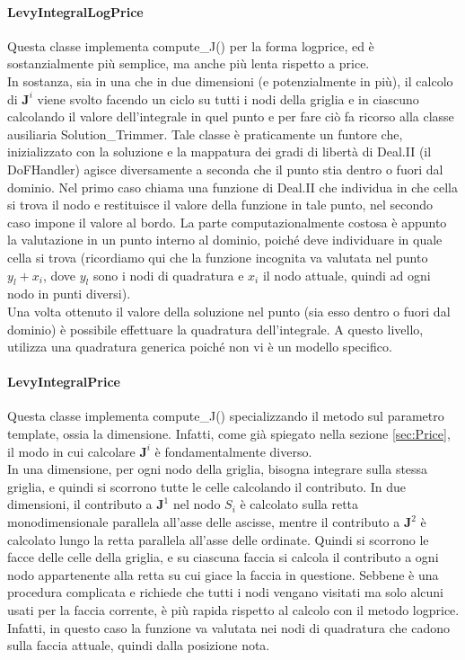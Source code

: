 \documentclass[a4paper,10pt]{report}
\theoremstyle{plain}
\theoremstyle{definition}
\theoremstyle{remark}
\begin{document}
\paragraph{\textsf{LevyIntegralLogPrice}}
Questa classe implementa \textsf{compute\_J()} per la forma logprice, ed è sostanzialmente più semplice, ma anche più lenta rispetto a price.\\
In sostanza, sia in una che in due dimensioni (e potenzialmente in più), il calcolo di $\mathbf{J}^i$ viene svolto facendo un ciclo su tutti i nodi della griglia e in ciascuno calcolando il valore dell'integrale in quel punto e per fare ciò fa ricorso alla classe ausiliaria \textsf{Solution\_Trimmer}. Tale classe è praticamente un funtore che, inizializzato con la soluzione e la mappatura dei gradi di libertà di Deal.II (il \textsf{DoFHandler}) agisce diversamente a seconda che il punto stia dentro o fuori dal dominio. Nel primo caso chiama una funzione di Deal.II che individua in che cella si trova il nodo e restituisce il valore della funzione in tale punto, nel secondo caso impone il valore al bordo. La parte computazionalmente costosa è appunto la valutazione in un punto interno al dominio, poiché deve individuare in quale cella si trova (ricordiamo qui che la funzione incognita va valutata nel punto $y_l+x_i$, dove $y_l$ sono i nodi di quadratura e $x_i$ il nodo attuale, quindi ad ogni nodo in punti diversi).\\
Una volta ottenuto il valore della soluzione nel punto (sia esso dentro o fuori dal dominio) è possibile effettuare la quadratura dell'integrale. A questo livello, utilizza una quadratura generica poiché non vi è un modello specifico.
\paragraph{\textsf{LevyIntegralPrice}}
\label{subsec:LevyIntegralPrice}
Questa classe implementa \textsf{compute\_J()} specializzando il metodo sul parametro template, ossia la dimensione. Infatti, come già spiegato nella sezione \ref{sec:Price}, il modo in cui calcolare $\mathbf{J}^i$ è fondamentalmente diverso.\\
In una dimensione, per ogni nodo della griglia, bisogna integrare sulla stessa griglia, e quindi si scorrono tutte le celle calcolando il contributo. In due dimensioni, il contributo a $\mathbf{J}^1$ nel nodo $S_i$ è calcolato sulla retta monodimensionale parallela all'asse delle ascisse, mentre il contributo a $\mathbf{J}^2$ è calcolato lungo la retta parallela all'asse delle ordinate. Quindi si scorrono le facce delle celle della griglia, e su ciascuna faccia si calcola il contributo a ogni nodo appartenente alla retta su cui giace la faccia in questione. Sebbene è una procedura complicata  e richiede che tutti i nodi vengano visitati ma solo alcuni usati per la faccia corrente, è più rapida rispetto al calcolo con il metodo logprice. Infatti, in questo caso la funzione va valutata nei nodi di quadratura che cadono sulla faccia attuale, quindi dalla posizione nota.
\end{document}
